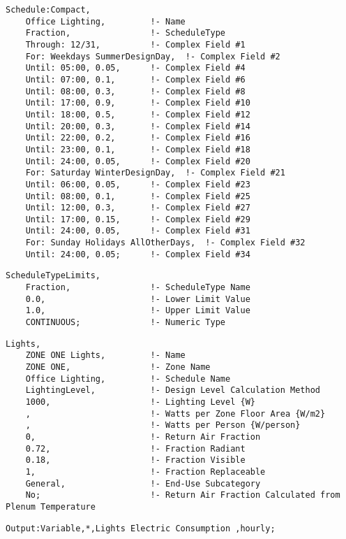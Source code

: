 \begin{lstlisting}
Schedule:Compact,
    Office Lighting,         !- Name
    Fraction,                !- ScheduleType
    Through: 12/31,          !- Complex Field #1
    For: Weekdays SummerDesignDay,  !- Complex Field #2
    Until: 05:00, 0.05,      !- Complex Field #4
    Until: 07:00, 0.1,       !- Complex Field #6
    Until: 08:00, 0.3,       !- Complex Field #8
    Until: 17:00, 0.9,       !- Complex Field #10
    Until: 18:00, 0.5,       !- Complex Field #12
    Until: 20:00, 0.3,       !- Complex Field #14
    Until: 22:00, 0.2,       !- Complex Field #16
    Until: 23:00, 0.1,       !- Complex Field #18
    Until: 24:00, 0.05,      !- Complex Field #20
    For: Saturday WinterDesignDay,  !- Complex Field #21
    Until: 06:00, 0.05,      !- Complex Field #23
    Until: 08:00, 0.1,       !- Complex Field #25
    Until: 12:00, 0.3,       !- Complex Field #27
    Until: 17:00, 0.15,      !- Complex Field #29
    Until: 24:00, 0.05,      !- Complex Field #31
    For: Sunday Holidays AllOtherDays,  !- Complex Field #32
    Until: 24:00, 0.05;      !- Complex Field #34
\end{lstlisting}

\begin{lstlisting}
ScheduleTypeLimits,
    Fraction,                !- ScheduleType Name
    0.0,                     !- Lower Limit Value
    1.0,                     !- Upper Limit Value
    CONTINUOUS;              !- Numeric Type
\end{lstlisting}

\begin{lstlisting}
Lights,
    ZONE ONE Lights,         !- Name
    ZONE ONE,                !- Zone Name
    Office Lighting,         !- Schedule Name
    LightingLevel,           !- Design Level Calculation Method
    1000,                    !- Lighting Level {W}
    ,                        !- Watts per Zone Floor Area {W/m2}
    ,                        !- Watts per Person {W/person}
    0,                       !- Return Air Fraction
    0.72,                    !- Fraction Radiant
    0.18,                    !- Fraction Visible
    1,                       !- Fraction Replaceable
    General,                 !- End-Use Subcategory
    No;                      !- Return Air Fraction Calculated from Plenum Temperature
\end{lstlisting}

\begin{lstlisting}
Output:Variable,*,Lights Electric Consumption ,hourly;
\end{lstlisting}

